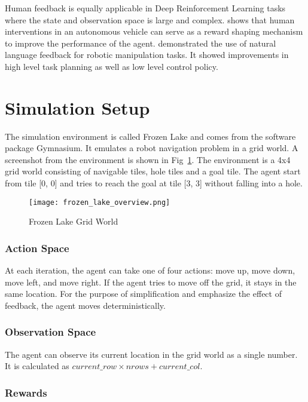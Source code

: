 \documentclass[conference]{IEEEtran}
\begin{document}
Human feedback is equally applicable in Deep Reinforcement Learning tasks where the state and observation space is large and complex. \cite{j.wuHumanGuidedReinforcementLearning2023} shows that human interventions in an autonomous vehicle can serve as a reward shaping mechanism to improve the performance of the agent. \cite{zhaDistillingRetrievingGeneralizable2024} demonstrated the use of natural language feedback for robotic manipulation tasks. It showed improvements in high level task planning as well as low level control policy.

\section{Simulation Setup}

The simulation environment is called Frozen Lake and comes from the software package Gymnasium\cite{towersGymnasium2024}. It emulates a robot navigation problem in a grid world. A screenshot from the environment is shown in Fig~\ref{fig:frozen_lake_overview}. The environment is a 4x4 grid world consisting of navigable tiles, hole tiles and a goal tile. The agent start from tile [0, 0] and tries to reach the goal at tile [3, 3] without falling into a hole.

\begin{figure}
    \centering
    \texttt{[image: frozen\_lake\_overview.png]}
    \caption{Frozen Lake Grid World}
    \label{fig:frozen_lake_overview}
\end{figure}

\subsubsection{Action Space}

At each iteration, the agent can take one of four actions: move up, move down, move left, and move right. If the agent tries to move off the grid, it stays in the same location. For the purpose of simplification and emphasize the effect of feedback, the agent moves deterministically.

\subsubsection{Observation Space}

The agent can observe its current location in the grid world as a single number. It is calculated as \(current\_row \times nrows + current\_col\).

\subsubsection{Rewards}
\end{document}
